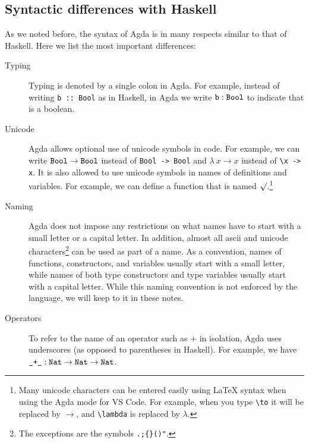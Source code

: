 \documentclass[a4paper,UKenglish]{tufte-handout}
\theoremstyle{definition}
\newcommand\fun[1]{{\AgdaFunction{#1}}}
\newcommand\data[1]{{\AgdaFunction{#1}}}
\newcommand\Nat{\data{Nat}}
\newcommand\Bool{\data{Bool}}
\begin{document}
\subsection{Syntactic differences with Haskell}

As we noted before, the syntax of Agda is in many respects similar to
that of Haskell. Here we list the most important differences:

\begin{description}

\item[Typing] Typing is denoted by a single colon in Agda. For example, instead
of writing \texttt{b ::~Bool} as in Haskell, in Agda we write $\fun{b} : \Bool$
to indicate that \fun{b} is a boolean.

\item[Unicode] Agda allows optional use of unicode symbols in
code. For example, we can write $\Bool \to \Bool$ instead of
\texttt{Bool -> Bool} and $\lambda\ x \to x$ instead of
\texttt{\textbackslash x -> x}. It is also allowed to use unicode
symbols in names of definitions and variables. For example, we can
define a function that is named $\surd$.\footnote[][-2cm]{Many unicode
characters can be entered easily using LaTeX syntax when using the
Agda mode for VS Code. For example, when you type
\texttt{\textbackslash{}to} it will be replaced by $\to$, and
\texttt{\textbackslash{}lambda} is replaced by $\lambda$.}

\item[Naming] Agda does not impose any restrictions on what names have
to start with a small letter or a capital letter. In addition, almost
all ascii and unicode characters\footnote{The exceptions are the
symbols \texttt{.;\{\}()\@"}.} can be used as part of a name. As a
convention, names of functions, constructors, and variables usually
start with a small letter, while names of both type constructors and
type variables usually start with a capital letter. While this naming
convention is not enforced by the language, we will keep to it in
these notes.

\item[Operators] To refer to the name of an operator such as $+$ in isolation,
Agda uses underscores (as opposed to parentheses in Haskell). For example, we
have $\fun{\_+\_} : \Nat \to \Nat \to \Nat$.


\end{description}
\end{document}
